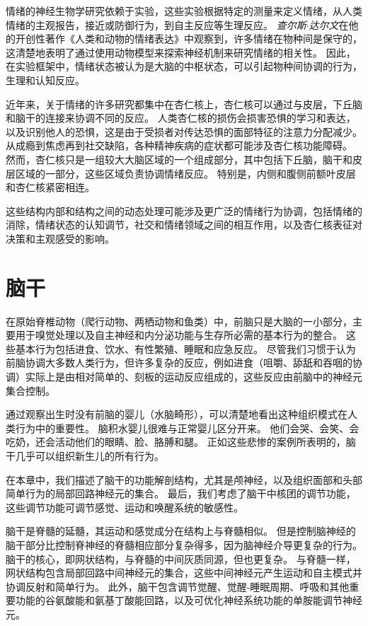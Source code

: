 情绪的神经生物学研究依赖于实验，这些实验根据特定的测量来定义情绪，从人类情绪的主观报告，接近或防御行为，到自主反应等生理反应。
\textit{查尔斯$\cdot$达尔文}在他的开创性著作《人类和动物的情绪表达》中观察到，许多情绪在物种间是保守的，这清楚地表明了通过使用动物模型来探索神经机制来研究情绪的相关性。
因此，在实验框架中，情绪状态被认为是大脑的中枢状态，可以引起物种间协调的行为，生理和认知反应。


近年来，关于情绪的许多研究都集中在杏仁核上，杏仁核可以通过与皮层，下丘脑和脑干的连接来协调不同的反应。
人类杏仁核的损伤会损害恐惧的学习和表达，以及识别他人的恐惧，这是由于受损者对传达恐惧的面部特征的注意力分配减少。
从成瘾到焦虑再到社交缺陷，各种精神疾病的症状都可能涉及杏仁核功能障碍。
然而，杏仁核只是一组较大大脑区域的一个组成部分，其中包括下丘脑，脑干和皮层区域的一部分，这些区域负责协调情绪反应。
特别是，内侧和腹侧前额叶皮层和杏仁核紧密相连。

这些结构内部和结构之间的动态处理可能涉及更广泛的情绪行为协调，包括情绪的消除，情绪状态的认知调节，社交和情绪领域之间的相互作用，以及杏仁核表征对决策和主观感受的影响。


\chapter{脑干} \label{chap:chap40}

在原始脊椎动物（爬行动物、两栖动物和鱼类）中，前脑只是大脑的一小部分，主要用于嗅觉处理以及自主神经和内分泌功能与生存所必需的基本行为的整合。
这些基本行为包括进食、饮水、有性繁殖、睡眠和应急反应。
尽管我们习惯于认为前脑协调大多数人类行为，但许多复杂的反应，例如进食（咀嚼、舔舐和吞咽的协调）实际上是由相对简单的、刻板的运动反应组成的，这些反应由前脑中的神经元集合控制。


通过观察出生时没有前脑的婴儿（水脑畸形），可以清楚地看出这种组织模式在人类行为中的重要性。
脑积水婴儿很难与正常婴儿区分开来。
他们会哭、会笑、会吃奶，还会活动他们的眼睛、脸、胳膊和腿。
正如这些悲惨的案例所表明的，脑干几乎可以组织新生儿的所有行为。


在本章中，我们描述了脑干的功能解剖结构，尤其是颅神经，以及组织面部和头部简单行为的局部回路神经元的集合。
最后，我们考虑了脑干中核团的调节功能，这些调节功能可调节感觉、运动和唤醒系统的敏感性。


脑干是脊髓的延髓，其运动和感觉成分在结构上与脊髓相似。
但是控制脑神经的脑干部分比控制脊神经的脊髓相应部分复杂得多，因为脑神经介导更复杂的行为。
脑干的核心，即网状结构，与脊髓的中间灰质同源，但也更复杂。
与脊髓一样，网状结构包含局部回路中间神经元的集合，这些中间神经元产生运动和自主模式并协调反射和简单行为。
此外，脑干包含调节觉醒、觉醒-睡眠周期、呼吸和其他重要功能的谷氨酸能和氨基丁酸能回路，以及可优化神经系统功能的单胺能调节神经元。



